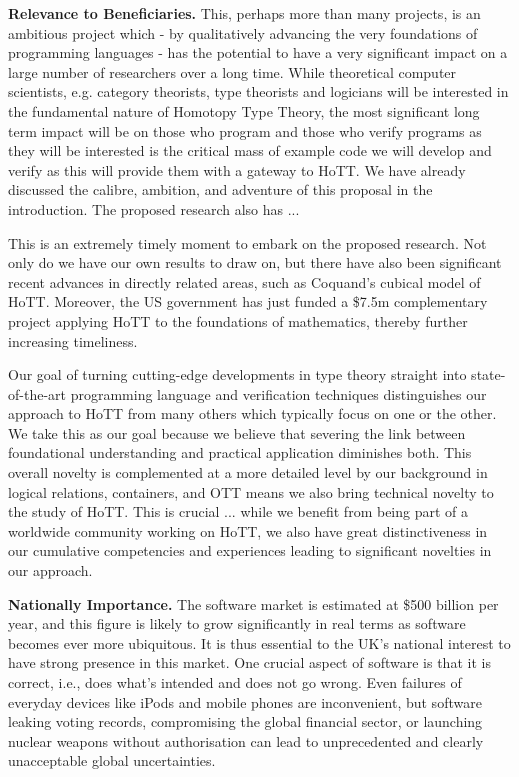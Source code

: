 \documentclass[a4paper,11pt]{article}
\begin{document}
\vspace*{-0.1in}


{\bf Relevance to Beneficiaries.} This, perhaps more than many
projects, is an ambitious project which - by qualitatively advancing
the very foundations of programming languages - has the potential to
have a very significant impact on a large number of researchers over a
long time. While theoretical computer scientists, e.g. category
theorists, type theorists and logicians will be interested in the
fundamental nature of Homotopy Type Theory, the most significant long
term impact will be on those who program and those who verify programs
as they will be interested is the critical mass of example code we
will develop and verify as this will provide them with a gateway to
HoTT. We have already discussed the calibre, ambition, and adventure
of this proposal in the introduction. The proposed research also has ...

 This is an extremely timely moment to
embark on the proposed research. Not only do we have our own results
to draw on, but there have also been significant recent advances in
directly related areas, such as Coquand's cubical model of HoTT.
Moreover, the US government has just funded a \$7.5m complementary
project applying HoTT to the foundations of mathematics, thereby
further increasing timeliness.

Our goal of turning cutting-edge developments in type theory straight
into state-of-the-art programming language and verification techniques
distinguishes our approach to HoTT from many others which typically
focus on one or the other. We take this as our goal because we believe
that severing the link between foundational understanding and
practical application diminishes both. This overall novelty is
complemented at a more detailed level by our background in logical
relations, containers, and OTT means we also bring technical novelty
to the study of HoTT. This is crucial ... while we benefit from being
part of a worldwide community working on HoTT, we also have great
distinctiveness in our cumulative competencies and experiences leading to 
significant novelties in our approach.
 
\vspace*{0.02in}

{\bf Nationally Importance.} The software market is estimated at \$500
billion per year, and this figure is likely to grow 
significantly in real terms 
as software becomes ever more
ubiquitous. It is thus essential to the UK's national interest to have 
strong presence in this market. One crucial aspect of software is that
it is correct, i.e., does what's intended and does not go wrong.  Even
failures of everyday devices like iPods and mobile phones are
inconvenient,
but software leaking voting records,
compromising %
the global financial sector, or launching 
nuclear weapons without authorisation 
can lead to unprecedented and clearly unacceptable global uncertainties.
\end{document}
